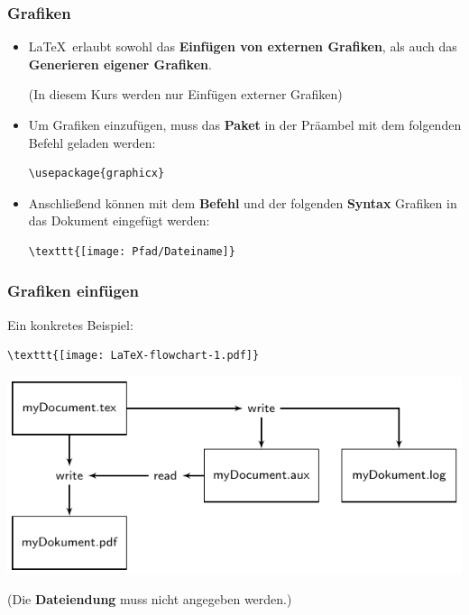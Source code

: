 \begin{frame}[fragile]
\frametitle{Grafiken}

\begin{itemize}
	\item \LaTeX\ erlaubt sowohl das \textbf{Einfügen von externen Grafiken}, als auch das \textbf{Generieren eigener Grafiken}.
	
	(In diesem Kurs werden \ras nur Einfügen externer Grafiken)
	
	\item Um Grafiken einzufügen, muss das \textbf{Paket}  in der Präambel mit dem folgenden Befehl geladen werden: 
	
\begin{lstlisting}
\usepackage{graphicx}
\end{lstlisting}

	\item Anschließend können mit dem \textbf{Befehl}  und der folgenden \textbf{Syntax} Grafiken in das Dokument eingefügt werden:
	
\begin{lstlisting}
\texttt{[image: Pfad/Dateiname]}  
\end{lstlisting}


\end{itemize}

\end{frame}


\begin{frame}[fragile]
\frametitle{Grafiken einfügen}

\noindent Ein konkretes Beispiel:

\begin{lstlisting}
\texttt{[image: LaTeX-flowchart-1.pdf]}    
\end{lstlisting}

\includegraphics{../../texfiles-beamer/tex-material/WissArb-latex/LaTeX-flowchart-1.pdf}   

(Die \textbf{Dateiendung}  muss \idR nicht angegeben werden.) 

\end{frame}


